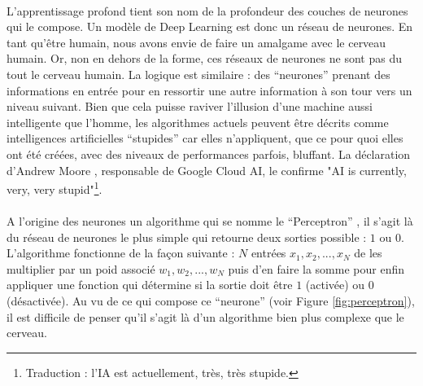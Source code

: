 \documentclass[10pt, french, a4paper]{report}
\begin{document}
\paragraph{}
L'apprentissage profond tient son nom de la profondeur des couches de neurones qui le compose. Un modèle de Deep Learning est donc un réseau de neurones. En tant qu'être humain, nous avons envie de faire un amalgame avec le cerveau humain. Or, non en dehors de la forme, ces réseaux de neurones ne sont pas du tout le cerveau humain. La logique est similaire : des ``neurones'' prenant des informations en entrée pour en ressortir une autre information à son tour vers un niveau suivant. Bien que cela puisse raviver l’illusion d’une machine aussi intelligente que l’homme, les algorithmes actuels peuvent être décrits comme intelligences artificielles ``stupides'' car elles n’appliquent, que ce pour quoi elles ont été créées, avec des niveaux de performances parfois, bluffant. La déclaration d’Andrew Moore \citep{newsflash_ai_2018}, responsable de Google Cloud AI, le confirme "AI is currently, very, very stupid"\footnote{Traduction : l’IA est actuellement, très, très stupide.}.

\paragraph{}
A l'origine des neurones un algorithme qui se nomme le ``Perceptron'' \citep{rosenblatt_perceptron_1958}, il s'agit là du réseau de neurones le plus simple qui retourne deux sorties possible : $1$ ou $0$. L'algorithme fonctionne de la façon suivante : $N$ entrées $x_1, x_2, ..., x_N$ de les multiplier par un poid associé $w_1, w_2, ..., w_N$ puis d'en faire la somme pour enfin appliquer une fonction qui détermine si la sortie doit être $1$ (activée) ou $0$ (désactivée). Au vu de ce qui compose ce ``neurone'' (voir Figure \ref{fig:perceptron}), il est difficile de penser qu'il s'agit là d'un algorithme bien plus complexe que le cerveau.
\end{document}
